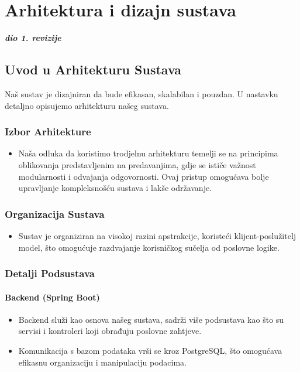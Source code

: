 \chapter{Arhitektura i dizajn sustava}

\textbf{\textit{dio 1. revizije}}\\

\section*{Uvod u Arhitekturu Sustava}
Naš sustav je dizajniran da bude efikasan, skalabilan i pouzdan. U nastavku detaljno opisujemo arhitekturu našeg sustava.

\subsection*{Izbor Arhitekture}
\begin{itemize}
    \item Naša odluka da koristimo trodjelnu arhitekturu temelji se na principima oblikovanja predstavljenim na predavanjima, gdje se ističe važnost modularnosti i odvajanja odgovornosti. Ovaj pristup omogućava bolje upravljanje kompleksnošću sustava i lakše održavanje.
\end{itemize}

\subsection*{Organizacija Sustava}
\begin{itemize}
    \item Sustav je organiziran na visokoj razini apstrakcije, koristeći klijent-poslužitelj model, što omogućuje razdvajanje korisničkog sučelja od poslovne logike.
\end{itemize}

\subsection*{Detalji Podsustava}
\subsubsection*{Backend (Spring Boot)}
\begin{itemize}
    \item Backend služi kao osnova našeg sustava, sadrži više podsustava kao što su servisi i kontroleri koji obrađuju poslovne zahtjeve.
    \item Komunikacija s bazom podataka vrši se kroz PostgreSQL, što omogućava efikasnu organizaciju i manipulaciju podacima.
\end{itemize}

